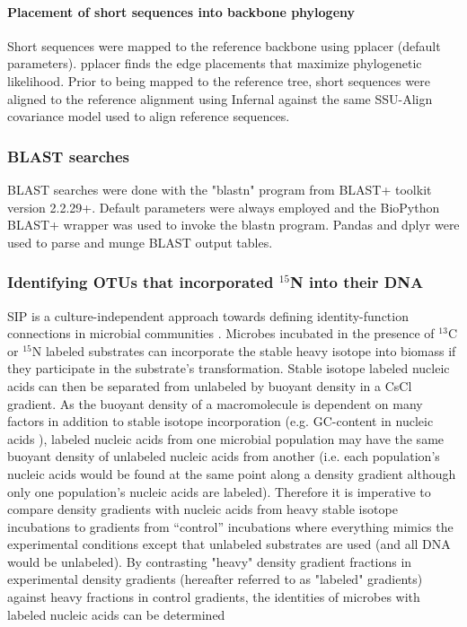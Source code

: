 \paragraph{Placement of short sequences into backbone phylogeny}
Short sequences were mapped to the reference backbone using pplacer
\citep{Matsen_2010} (default parameters). pplacer finds the edge placements
that maximize phylogenetic likelihood. Prior to being mapped to the reference
tree, short sequences were aligned to the reference alignment using Infernal
\citep{19307242} against the same SSU-Align covariance model used to align
reference sequences.

\subsubsection{BLAST searches}
BLAST searches were done with the "blastn" program from BLAST+ toolkit
\citep{20003500} version 2.2.29+. Default parameters were always employed and
the BioPython \citep{19304878} BLAST+ wrapper was used to invoke the blastn
program. Pandas \citep{citeulike:11241428} and dplyr \citep{dplyr} were used to
parse and munge BLAST output tables.  

\subsubsection{Identifying OTUs that incorporated $^{15}$N into their DNA}
SIP is a culture-independent approach towards defining identity-function
connections in microbial communities \citep{Buckley_2011, 17446886}. Microbes
incubated in the presence of $^{13}$C or $^{15}$N
labeled substrates can incorporate the stable heavy isotope into biomass if
they participate in the substrate's transformation.  Stable isotope labeled nucleic acids
can then be separated from unlabeled by buoyant density in a CsCl gradient. As
the buoyant density of a macromolecule is dependent on many factors in addition
to stable isotope incorporation (e.g.  GC-content in nucleic acids
\citep{25139123}), labeled nucleic acids from one microbial population may have
the same buoyant density of unlabeled nucleic acids from another (i.e.  each
population's nucleic acids would be found at the same point along a density
gradient although only one population's nucleic acids are labeled). Therefore it
is imperative to compare density gradients with nucleic acids from heavy stable
isotope incubations to gradients from ``control'' incubations where everything
mimics the experimental conditions except that unlabeled substrates are used (and
all DNA would be unlabeled).  By contrasting "heavy" density gradient fractions
in experimental density gradients (hereafter referred to as "labeled"
gradients) against heavy fractions in control gradients, the identities of
microbes with labeled nucleic acids can be determined 

